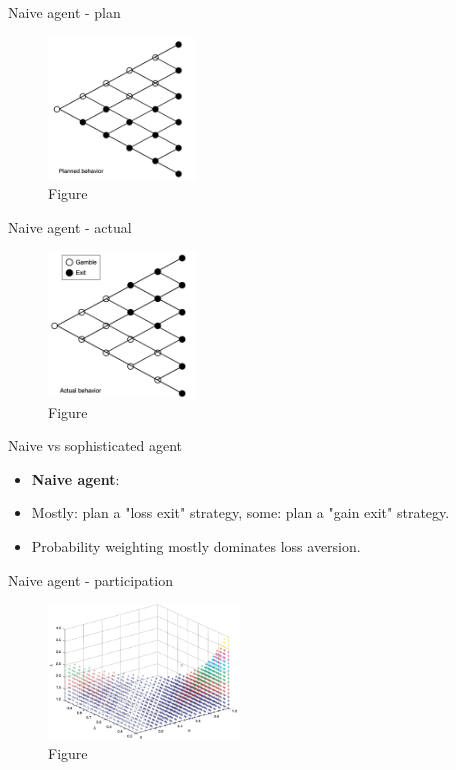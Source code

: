 \begin{frame}{Naive agent - plan}
\begin{figure}
\centering
    \includegraphics[width = 0.35\textwidth]{naive_plan.png}
    \caption{Figure \citet{Barberis2012a}}
    \end{figure}
\end{frame}

\begin{frame}{Naive agent - actual}
\begin{figure}
\centering
    \includegraphics[width = 0.35\textwidth]{naive_final.png}
    \caption{Figure \citet{Barberis2012a}}
    \end{figure}
\end{frame}


\begin{frame}{Naive vs sophisticated agent}
    \begin{itemize}
    	\item \textbf{Naive agent}:\medskip
        \item Mostly: plan a "loss exit" strategy, some: plan a "gain exit" strategy.\medskip
        \item Probability weighting mostly  dominates loss aversion.\bigskip
  	    \end{itemize}
\end{frame}

\begin{frame}{Naive agent - participation}
\begin{figure}
\centering
    \includegraphics[width = 0.45\textwidth]{cpt_naive}
    \caption{Figure \citet{Barberis2012a}}
    \end{figure}
\end{frame}

